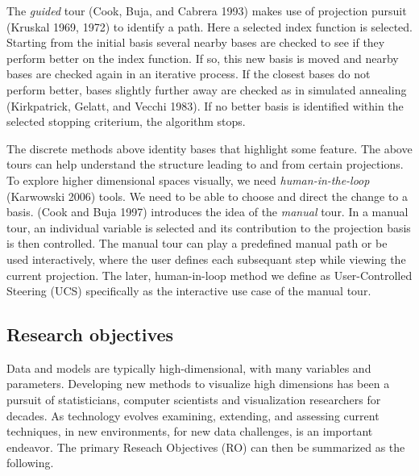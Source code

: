 \documentclass[11,]{article}
\begin{document}
The \emph{guided} tour (Cook, Buja, and Cabrera 1993) makes use of projection pursuit (Kruskal 1969, 1972) to identify a path. Here a selected index function is selected. Starting from the initial basis several nearby bases are checked to see if they perform better on the index function. If so, this new basis is moved and nearby bases are checked again in an iterative process. If the closest bases do not perform better, bases slightly further away are checked as in simulated annealing (Kirkpatrick, Gelatt, and Vecchi 1983). If no better basis is identified within the selected stopping criterium, the algorithm stops.

The discrete methods above identity bases that highlight some feature. The above tours can help understand the structure leading to and from certain projections. To explore higher dimensional spaces visually, we need \emph{human-in-the-loop} (Karwowski 2006) tools. We need to be able to choose and direct the change to a basis. (Cook and Buja 1997) introduces the idea of the \emph{manual} tour. In a manual tour, an individual variable is selected and its contribution to the projection basis is then controlled. The manual tour can play a predefined manual path or be used interactively, where the user defines each subsequant step while viewing the current projection. The later, human-in-loop method we define as User-Controlled Steering (UCS) specifically as the interactive use case of the manual tour.

\hypertarget{research-objectives}{%
\subsection{Research objectives}\label{research-objectives}}

Data and models are typically high-dimensional, with many variables and parameters. Developing new methods to visualize high dimensions has been a pursuit of statisticians, computer scientists and visualization researchers for decades. As technology evolves examining, extending, and assessing current techniques, in new environments, for new data challenges, is an important endeavor. The primary Reseach Objectives (RO) can then be summarized as the following.
\end{document}
